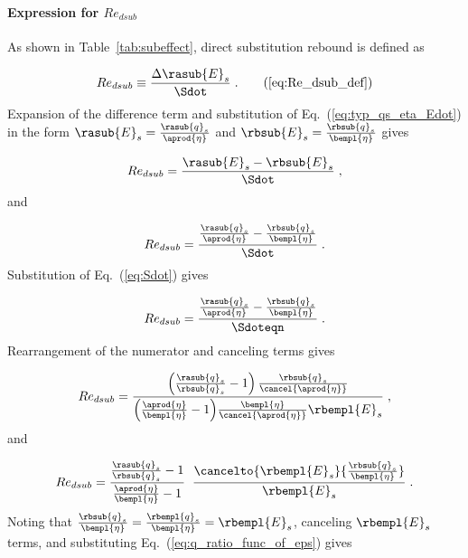 \paragraph{Expression for $Re_{dsub}$}
\label{sec:Re_dsub}

As shown in Table~\ref{tab:subeffect}, direct substitution rebound is defined as

\begin{equation}
  Re_{dsub} \equiv \frac{\Delta \rasub{E}_s}{\Sdot} \; . \tag{\ref{eq:Re_dsub_def}}
\end{equation}
%
Expansion of the difference term and
substitution of Eq.~(\ref{eq:typ_qs_eta_Edot}) in the form
$\rasub{E}_s = \frac{\rasub{q}_s}{\aprod{\eta}}$
and
$\rbsub{E}_s = \frac{\rbsub{q}_s}{\bempl{\eta}}$
gives

\begin{equation}
   Re_{dsub} = \frac{\rasub{E}_s - \rbsub{E}_s}{\Sdot} \; ,
\end{equation}
%
and

\begin{equation}
     Re_{dsub} = \frac{\frac{\rasub{q}_s}{\aprod{\eta}} - \frac{\rbsub{q}_s}{\bempl{\eta}}}{\Sdot} \; .
\end{equation}
%
Substitution of Eq.~(\ref{eq:Sdot}) gives

\begin{equation}
  Re_{dsub} = \frac{\frac{\rasub{q}_s}{\aprod{\eta}} - \frac{\rbsub{q}_s}{\bempl{\eta}}}
              {\Sdoteqn} \; .
\end{equation}
%
Rearrangement of the numerator and canceling terms gives

\begin{equation}
  Re_{dsub} = \frac{\left( \frac{\rasub{q}_s}{\rbsub{q}_s} - 1 \right) \frac{\rbsub{q}_s}{\cancel{\aprod{\eta}}} }
              {\left( \frac{\aprod{\eta}}{\bempl{\eta}} - 1 \right)\!\frac{\bempl{\eta}}{\cancel{\aprod{\eta}}} \rbempl{E}_s} \; ,
\end{equation}
%
and

\begin{equation}
    Re_{dsub} = \frac{\frac{\rasub{q}_s}{\rbsub{q}_s} - 1}{\frac{\aprod{\eta}}{\bempl{\eta}} - 1} \; \;
                \frac{\cancelto{\rbempl{E}_s}{\frac{\rbsub{q}_s}{\bempl{\eta}}}}{\rbempl{E}_s} \; .
\end{equation}
%
Noting that $\frac{\rbsub{q}_s}{\bempl{\eta}} = \frac{\rbempl{q}_s}{\bempl{\eta}} = \rbempl{E}_s$,
canceling $\rbempl{E}_s$ terms,
and substituting Eq.~(\ref{eq:q_ratio_func_of_eps}) gives

